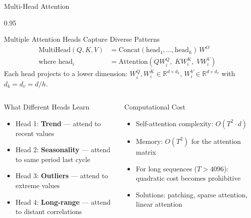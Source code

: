 \documentclass[9pt, aspectratio=169, t]{beamer}
\begin{document}
\begin{frame}{Multi-Head Attention}
    \begin{cminipage}{0.95\textwidth}
    \vspace{-2mm}
    \begin{block}{Multiple Attention Heads Capture Diverse Patterns}
        \vspace{-2mm}
        \begin{align*}
            \text{MultiHead}(Q,K,V) &= \text{Concat}(\text{head}_1, \ldots, \text{head}_h)\, W^O \\
            \text{where head}_i &= \text{Attention}(QW_i^Q,\; KW_i^K,\; VW_i^V)
        \end{align*}
        \vspace{-4mm}
        {\small Each head projects to a lower dimension: $W_i^Q, W_i^K \in \mathbb{R}^{d \times d_k}$, $W_i^V \in \mathbb{R}^{d \times d_v}$ with $d_k = d_v = d/h$.}
    \end{block}

    \vspace{-1mm}

    \begin{columns}[T]
        \begin{exampleblock}{What Different Heads Learn}
            {\scriptsize
            \begin{itemize}\setlength{\itemsep}{0pt}
                \item Head 1: \textbf{Trend} --- attend to recent values
                \item Head 2: \textbf{Seasonality} --- attend to same period last cycle
                \item Head 3: \textbf{Outliers} --- attend to extreme values
                \item Head 4: \textbf{Long-range} --- attend to distant correlations
            \end{itemize}
            }
        \end{exampleblock}

        \begin{alertblock}{Computational Cost}
            {\scriptsize
            \begin{itemize}\setlength{\itemsep}{0pt}
                \item Self-attention complexity: $O(T^2 \cdot d)$
                \item Memory: $O(T^2)$ for the attention matrix
                \item For long sequences ($T > 4096$): quadratic cost becomes prohibitive
                \item Solutions: patching, sparse attention, linear attention
            \end{itemize}
            }
        \end{alertblock}
    \end{columns}
    \end{cminipage}
\end{frame}
\end{document}
